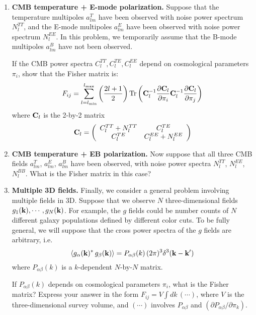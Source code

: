 \documentclass[aps,prd,superscriptaddress,groupedaddress,nofootinbib,nobibnotes]{revtex4}
\newcommand{\be}{\begin{equation}}
\newcommand{\ee}{\end{equation}}
\def\k{{\bf k}}
\begin{document}
\begin{enumerate}
\setcounter{enumi}{\value{enumi_save}}

\item {\bf CMB temperature + E-mode polarization.}
Suppose that the temperature multipoles $a_{lm}^T$ have been observed with noise power spectrum $N_l^{TT}$,
and the E-mode multipoles $a_{lm}^E$ have been observed with noise power spectrum $N_l^{EE}$.
In this problem, we temporarily assume that the B-mode multipoles $a_{lm}^B$ have not been observed.

If the CMB power spectra $C_l^{TT}, C_l^{TE}, C_l^{EE}$ depend on cosmological parameters $\pi_i$,
show that the Fisher matrix is:
\be
F_{ij} = \sum_{l=l_{\rm min}}^{l_{\rm max}} \left( \frac{2l+1}{2} \right) 
   \mbox{Tr}\left( {\bf C}^{-1}_l \frac{\partial {\bf C}_l}{\partial \pi_i} {\bf C}^{-1}_l \frac{\partial {\bf C}_l}{\partial \pi_j} \right)
\ee
where ${\bf C}_l$ is the 2-by-2 matrix
\be
{\bf C}_l = \left( \begin{array}{cc}
 C_l^{TT} + N_l^{TT} & C_l^{TE} \\
  C_l^{TE} & C_l^{EE} + N_l^{EE}
\end{array} \right)
\ee

\item {\bf CMB temperature + EB polarization.}
Now suppose that all three CMB fields $a_{lm}^T$, $a_{lm}^E$, $a_{lm}^B$ have been observed,
with noise power spectra $N_l^{TT}$, $N_l^{EE}$, $N_l^{BB}$.  What is the Fisher matrix
in this case?

\item {\bf Multiple 3D fields.}
Finally, we consider a general problem involving multiple fields in 3D.
Suppose that we observe $N$ three-dimensional fields $g_1(\k), \cdots, g_N(\k)$.
For example, the $g$ fields could be number counts of $N$ different galaxy populations
defined by different color cuts.
To be fully general, we will suppose that the cross power spectra of the $g$ fields are
arbitrary, i.e.
\be
\langle g_\alpha(\k)^* \, g_\beta(\k) \rangle = P_{\alpha\beta}(k) \, (2\pi)^3 \delta^3(\k-\k')
\ee
where $P_{\alpha\beta}(k)$ is a $k$-dependent $N$-by-$N$ matrix.

If $P_{\alpha\beta}(k)$ depends on cosmological parameters $\pi_i$, what is the Fisher matrix?
Express your answer in the form $F_{ij} = V \int dk \, (\cdots)$, where $V$ is the
three-dimensional survey volume, and $(\cdots)$ involves $P_{\alpha\beta}$ and $(\partial P_{\alpha\beta}/\partial \pi_k)$.

\end{enumerate}
\end{document}
